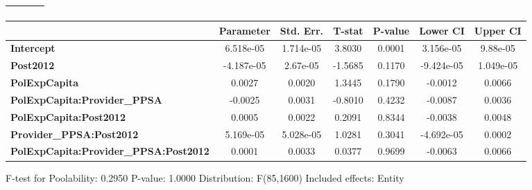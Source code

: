 \begin{center}
\begin{tabular}{lclc}
\textbf{}                                     &                    & \textbf{                     }   &                  \\
\bottomrule
\end{tabular}
\begin{tabular}{lcccccc}
                                              & \textbf{Parameter} & \textbf{Std. Err.} & \textbf{T-stat} & \textbf{P-value} & \textbf{Lower CI} & \textbf{Upper CI}  \\
\midrule
\textbf{Intercept}                            &     6.518e-05      &     1.714e-05      &      3.8030     &      0.0001      &     3.156e-05     &      9.88e-05      \\
\textbf{Post2012}                             &     -4.187e-05     &      2.67e-05      &     -1.5685     &      0.1170      &     -9.424e-05    &     1.049e-05      \\
\textbf{PolExpCapita}                         &       0.0027       &       0.0020       &      1.3445     &      0.1790      &      -0.0012      &       0.0066       \\
\textbf{PolExpCapita:Provider\_PPSA}          &      -0.0025       &       0.0031       &     -0.8010     &      0.4232      &      -0.0087      &       0.0036       \\
\textbf{PolExpCapita:Post2012}                &       0.0005       &       0.0022       &      0.2091     &      0.8344      &      -0.0038      &       0.0048       \\
\textbf{Provider\_PPSA:Post2012}              &     5.169e-05      &     5.028e-05      &      1.0281     &      0.3041      &     -4.692e-05    &       0.0002       \\
\textbf{PolExpCapita:Provider\_PPSA:Post2012} &       0.0001       &       0.0033       &      0.0377     &      0.9699      &      -0.0063      &       0.0066       \\
\bottomrule
\end{tabular}
\end{center}

F-test for Poolability: 0.2950 \newline
 P-value: 1.0000 \newline
 Distribution: F(85,1600) \newline
  \newline
 Included effects: Entity